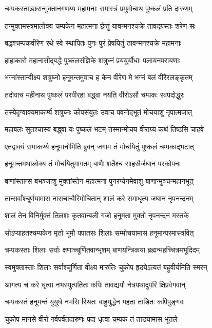 \twolineshloka
{चम्पकस्ताञ्छरान्मुक्तानगणय्य महामनाः}
{रामास्त्रं प्रमुमोचाथ पुष्कलं प्रति दारुणम्}%

\twolineshloka
{तन्मुक्तमस्त्रमालोक्य चम्पकेन महात्मना}
{छेत्तुं यावन्मनश्चक्रे तावद्ग्रस्तः शरेण सः}%

\twolineshloka
{बद्धश्चम्पकवीरेण रथे स्वे स्थापितः पुनः}
{पुरं प्रेषयितुं तावन्मनश्चक्रे महामनाः}%

\twolineshloka
{हाहाकारो महानासीद्बद्धे पुष्कलसंज्ञिके}
{शत्रुघ्नं प्रययुर्योधाः पलायनपरायणाः}%

\twolineshloka
{भग्नांस्तान्वीक्ष्य शत्रुघ्नो हनूमन्तमुवाच ह}
{केन वीरेण मे भग्नं बलं वीरैरलङ्कृतम्}%

\twolineshloka
{तदोवाच महीनाथ पुष्कलं परवीरहा}
{बद्ध्वा नयति वीरोऽसौ चम्पकः स्वपदोद्धुरः}%

\twolineshloka
{तस्येदृग्वाक्यमाकर्ण्य शत्रुघ्नः कोपसंयुतः}
{उवाच पवनोद्भूतं मोचयाशु नृपात्मजात्}%

\twolineshloka
{महाबलः सुतश्चास्य बद्ध्वा यः पुष्कलं भटम्}
{तस्मान्मोचय वीराग्र्य कथं तिष्ठसि चाहवे}%

\twolineshloka
{एतद्वाक्यं समाकर्ण्य हनूमानोमिति ब्रुवन्}
{जगाम तं मोचयितुं पुष्कलं चम्पकाद्भटात्}%

\twolineshloka
{हनूमन्तमथालोक्य तं मोचयितुमागतम्}
{बाणैः शतैश्च साहस्रैर्जघान परकोपनः}%

\twolineshloka
{बाणांस्तान्स बभञ्जाशु मुक्तांस्तेन महात्मना}
{पुनरप्येनमेवाशु बाणान्मुञ्चन्महानभूत्}%

\twolineshloka
{तान्सर्वांश्चूर्णयामास नाराचान्वैरिमोचितान्}
{शालं करे समाधृत्य जघान नृपनन्दनम्}%

\twolineshloka
{शालं तेन विनिर्मुक्तं तिलशः कृतवान्बली}
{गजो हनूमता मुक्तो नृपनन्दन मस्तके}%

\twolineshloka
{सोऽप्याहतश्चम्पकेन मृतो भूमौ पपातसः}
{शिलाः सम्मोचयामास हनूमान्परमास्त्रवित्}%

\twolineshloka
{चम्पकस्ताः शिलाः सर्वाः क्षणाच्चूर्णितवान्भृशम्}
{बाणयन्त्रिकया ब्रह्मन्महच्चित्रमभूदिदम्}%

\twolineshloka
{स्वमुक्तास्ताः शिलाः सर्वाश्चूर्णिता वीक्ष्य मारुतिः}
{चुकोप हृदयेऽत्यतं बहुवीर्यमिति स्मरन्}%

\twolineshloka
{आगत्य च करे धृत्वा नभस्युत्पतितः कपिः}
{तावद्ययौ नेत्रपथादुपरि क्षिप्रवेगवान्}%

\twolineshloka
{चम्पकस्तं हनूमन्तं युयुधे नभसि स्थितः}
{बाहुयुद्धेन महता ताडितः कपिपुङ्गवः}%

\twolineshloka
{चुकोप मानसे वीरो गर्वपर्वतदारुणः}
{पदा धृत्वा चम्पकं तं ताडयामास भूतले}%

